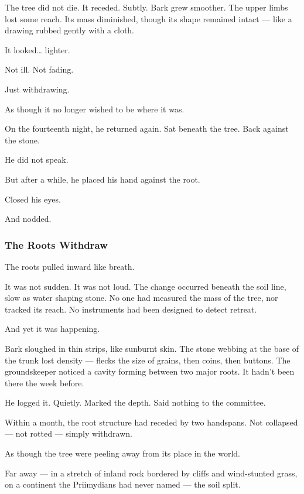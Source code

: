 \documentclass[12pt]{article}
\begin{document}
The tree did not die. It receded. Subtly. Bark grew smoother. The upper limbs lost some reach. Its mass diminished, though its shape remained intact --- like a drawing rubbed gently with a cloth.

It looked… lighter.

Not ill. Not fading.

Just withdrawing.

As though it no longer wished to be where it was.

\vspace{1em}

On the fourteenth night, he returned again. Sat beneath the tree. Back against the stone.

He did not speak.

But after a while, he placed his hand against the root.

Closed his eyes.

And nodded.

\dotfill

\subsubsection*{The Roots Withdraw}

The roots pulled inward like breath.

It was not sudden. It was not loud. The change occurred beneath the soil line, slow as water shaping stone. No one had measured the mass of the tree, nor tracked its reach. No instruments had been designed to detect retreat.

And yet it was happening.

Bark sloughed in thin strips, like sunburnt skin. The stone webbing at the base of the trunk lost density --- flecks the size of grains, then coins, then buttons. The groundskeeper noticed a cavity forming between two major roots. It hadn’t been there the week before.

He logged it. Quietly. Marked the depth. Said nothing to the committee.

Within a month, the root structure had receded by two handspans. Not collapsed --- not rotted --- simply withdrawn.

As though the tree were peeling away from its place in the world.

\vspace{1em}

Far away --- in a stretch of inland rock bordered by cliffs and wind-stunted grass, on a continent the Priimydians had never named --- the soil split.
\end{document}
